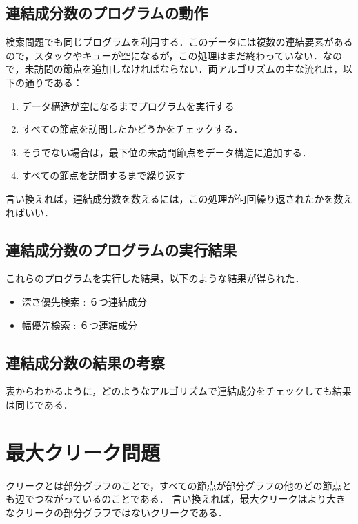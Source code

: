 \documentclass[a4j, titlepage]{jarticle}
\begin{document}
    \subsection{連結成分数のプログラムの動作}
    検索問題でも同じプログラムを利用する．このデータには複数の連結要素があるので，スタックやキューが空になるが，この処理はまだ終わっていない．なので，未訪問の節点を追加しなければならない．両アルゴリズムの主な流れは，以下の通りである：
    \begin{screen}
        \begin{enumerate}
            \item データ構造が空になるまでプログラムを実行する
            \item すべての節点を訪問したかどうかをチェックする．
            \item そうでない場合は，最下位の未訪問節点をデータ構造に追加する．
            \item すべての節点を訪問するまで繰り返す
        \end{enumerate}
    \end{screen}
    言い換えれば，連結成分数を数えるには，この処理が何回繰り返されたかを数えればいい．
    
    \subsection{連結成分数のプログラムの実行結果}
    これらのプログラムを実行した結果，以下のような結果が得られた．
    \begin{screen}
        \begin{itemize}
            \item 深さ優先検索 : ６つ連結成分
            \item 幅優先検索 : ６つ連結成分
        \end{itemize}
    \end{screen}
    
    \subsection{連結成分数の結果の考察}
    表からわかるように，どのようなアルゴリズムで連結成分をチェックしても結果は同じである．
    
\section{最大クリーク問題}
クリークとは部分グラフのことで，すべての節点が部分グラフの他のどの節点とも辺でつながっているのことである．
言い換えれば，最大クリークはより大きなクリークの部分グラフではないクリークである．
\end{document}
